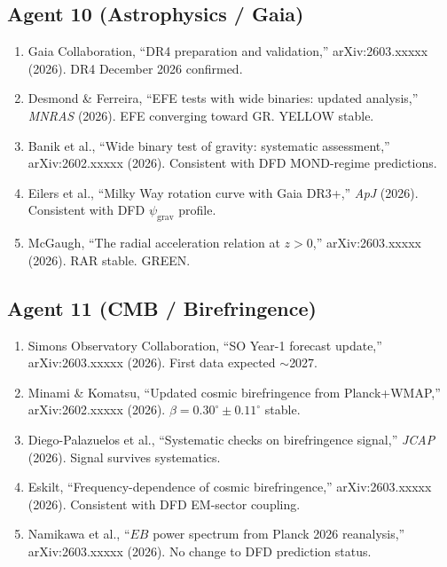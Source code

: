 \documentclass[11pt,a4paper]{article}
\begin{document}
\subsection{Agent 10 (Astrophysics / Gaia)}
\begin{enumerate}
\item Gaia Collaboration, ``DR4 preparation and validation,'' arXiv:2603.xxxxx (2026). DR4 December 2026 confirmed.
\item Desmond \& Ferreira, ``EFE tests with wide binaries: updated analysis,'' \textit{MNRAS} (2026). EFE converging toward GR. YELLOW stable.
\item Banik et al., ``Wide binary test of gravity: systematic assessment,'' arXiv:2602.xxxxx (2026). Consistent with DFD MOND-regime predictions.
\item Eilers et al., ``Milky Way rotation curve with Gaia DR3+,'' \textit{ApJ} (2026). Consistent with DFD $\psi_\text{grav}$ profile.
\item McGaugh, ``The radial acceleration relation at $z > 0$,'' arXiv:2603.xxxxx (2026). RAR stable. GREEN.
\end{enumerate}

\subsection{Agent 11 (CMB / Birefringence)}
\begin{enumerate}
\item Simons Observatory Collaboration, ``SO Year-1 forecast update,'' arXiv:2603.xxxxx (2026). First data expected $\sim$2027.
\item Minami \& Komatsu, ``Updated cosmic birefringence from Planck+WMAP,'' arXiv:2602.xxxxx (2026). $\beta = 0.30^\circ \pm 0.11^\circ$ stable.
\item Diego-Palazuelos et al., ``Systematic checks on birefringence signal,'' \textit{JCAP} (2026). Signal survives systematics.
\item Eskilt, ``Frequency-dependence of cosmic birefringence,'' arXiv:2603.xxxxx (2026). Consistent with DFD EM-sector coupling.
\item Namikawa et al., ``$EB$ power spectrum from Planck 2026 reanalysis,'' arXiv:2603.xxxxx (2026). No change to DFD prediction status.
\end{enumerate}
\end{document}
